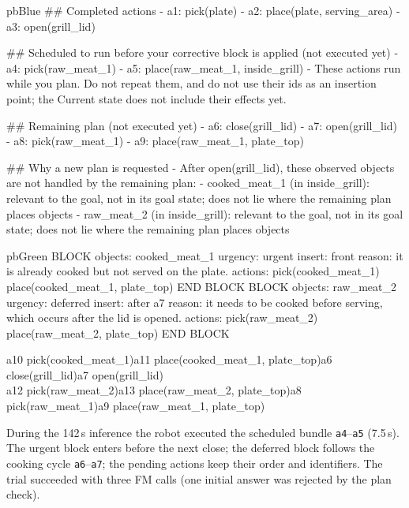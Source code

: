 \noindent\begin{minipage}[t]{0.575\textwidth}\vspace{0pt}
\begin{promptbox}[unbreakable]{pbBlue}{}
## Completed actions
- a1: pick(plate)
- a2: place(plate, serving_area)
- a3: open(grill_lid)

## Scheduled to run before your corrective block is applied (not executed yet)
- a4: pick(raw_meat_1)
- a5: place(raw_meat_1, inside_grill)
- These actions run while you plan. Do not repeat them, and do not use their ids as an insertion point; the Current state does not include their effects yet.

## Remaining plan (not executed yet)
- a6: close(grill_lid)
- a7: open(grill_lid)
- a8: pick(raw_meat_1)
- a9: place(raw_meat_1, plate_top)

## Why a new plan is requested
- After open(grill_lid), these observed objects are not handled by the remaining plan:
  - cooked_meat_1 (in inside_grill): relevant to the goal, not in its goal state; does not lie where the remaining plan places objects
  - raw_meat_2 (in inside_grill): relevant to the goal, not in its goal state; does not lie where the remaining plan places objects
\end{promptbox}
\end{minipage}\hfill
\begin{minipage}[t]{0.405\textwidth}\vspace{0pt}
\begin{promptbox}[unbreakable]{pbGreen}{}
BLOCK
objects: cooked_meat_1
urgency: urgent
insert: front
reason: it is already cooked but not served on the plate.
actions:
pick(cooked_meat_1)
place(cooked_meat_1, plate_top)
END BLOCK
BLOCK
objects: raw_meat_2
urgency: deferred
insert: after a7
reason: it needs to be cooked before serving, which occurs after the lid is opened.
actions:
pick(raw_meat_2)
place(raw_meat_2, plate_top)
END BLOCK
\end{promptbox}
\end{minipage}


\begin{tcolorbox}[notebox, title={System result: accepted on the first attempt; merged remaining plan $\widehat{\pi}$}]
{\ttfamily\footnotesize a10 pick(cooked\_meat\_1)\quad a11 place(cooked\_meat\_1, plate\_top)\quad a6 close(grill\_lid)\quad a7 open(grill\_lid)\\
a12 pick(raw\_meat\_2)\quad a13 place(raw\_meat\_2, plate\_top)\quad a8 pick(raw\_meat\_1)\quad a9 place(raw\_meat\_1, plate\_top)}\par\smallskip
During the 142\,s inference the robot executed the scheduled bundle \texttt{a4}--\texttt{a5} (7.5\,s). The urgent
block enters before the next close; the deferred block follows the cooking cycle \texttt{a6}--\texttt{a7}; the
pending actions keep their order and identifiers. The trial succeeded with three FM calls (one initial answer
was rejected by the plan check).
\end{tcolorbox}

